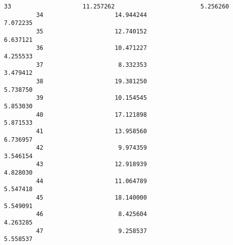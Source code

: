 \documentclass[11pt]{article}
\begin{document}
\begin{Verbatim}[commandchars=\\\{\}]
         33                    11.257262                        5.256260   
         34                    14.944244                        7.072235   
         35                    12.740152                        6.637121   
         36                    10.471227                        4.255533   
         37                     8.332353                        3.479412   
         38                    19.381250                        5.738750   
         39                    10.154545                        5.853030   
         40                    17.121898                        5.871533   
         41                    13.958560                        6.736957   
         42                     9.974359                        3.546154   
         43                    12.918939                        4.828030   
         44                    11.064789                        5.547418   
         45                    18.140000                        5.549091   
         46                     8.425604                        4.263285   
         47                     9.258537                        5.558537   
         

\end{Verbatim}
\end{document}
